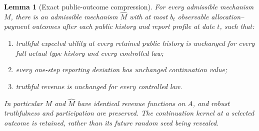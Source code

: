 \documentclass[11pt,a4paper]{article}
\newtheorem{lemma}[theorem]{Lemma}
\begin{document}
\begin{lemma}[Exact public-outcome compression]\label{lem:compression}
For every admissible mechanism $M$, there is an admissible mechanism
$\widehat M$ with at most $b_t$ observable allocation--payment outcomes
after each public history and report profile at date $t$, such that:
\begin{enumerate}
\item truthful expected utility at every retained public history is
unchanged for every full actual type history and every controlled law;
\item every one-step reporting deviation has unchanged continuation value;
\item truthful revenue is unchanged for every controlled law.
\end{enumerate}
In particular $M$ and $\widehat M$ have identical revenue functions on
$A$, and robust truthfulness and participation are preserved.
The continuation kernel at a selected outcome is retained, rather than
its future random seed being revealed.
\end{lemma}
\end{document}
